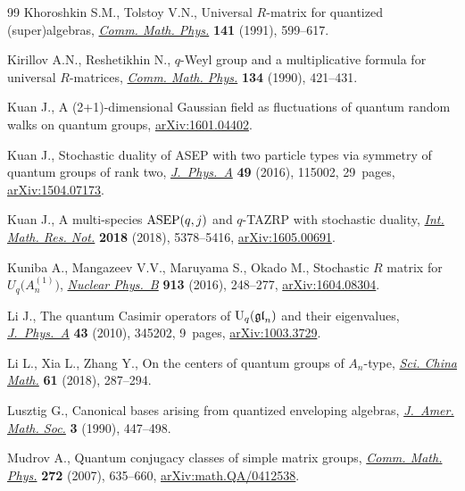 \documentclass[pdftex]{sigma}
\numberwithin{equation}{section}
\begin{document}
\begin{thebibliography}{99}
Khoroshkin S.M., Tolstoy V.N., Universal {$R$}-matrix for quantized
 (super)algebras, \href{https://doi.org/10.1007/BF02102819}{\textit{Comm. Math. Phys.}} \textbf{141} (1991), 599--617.

Kirillov A.N., Reshetikhin N., {$q$}-{W}eyl group and a multiplicative formula
 for universal {$R$}-matrices, \href{https://doi.org/10.1007/BF02097710}{\textit{Comm. Math. Phys.}} \textbf{134} (1990),
 421--431.

Kuan J., A (2+1)-dimensional {G}aussian field as fluctuations of quantum random
 walks on quantum groups, \href{https://arxiv.org/abs/1601.04402}{arXiv:1601.04402}.

Kuan J., Stochastic duality of {ASEP} with two particle types via symmetry of
 quantum groups of rank two, \href{https://doi.org/10.1088/1751-8113/49/11/115002}{\textit{J.~Phys.~A}} \textbf{49} (2016), 115002,
 29~pages, \href{https://arxiv.org/abs/1504.07173}{arXiv:1504.07173}.

Kuan J., A multi-species {${\rm ASEP}(q,j)$} and {$q$}-{TAZRP} with stochastic
 duality, \href{https://doi.org/10.1093/imrn/rnx034}{\textit{Int. Math. Res. Not.}} \textbf{2018} (2018), 5378--5416,
 \href{https://arxiv.org/abs/1605.00691}{arXiv:1605.00691}.

Kuniba A., Mangazeev V.V., Maruyama S., Okado M., Stochastic {$R$} matrix for
 {$U_q\big(A_n^{(1)}\big)$}, \href{https://doi.org/10.1016/j.nuclphysb.2016.09.016}{\textit{Nuclear Phys.~B}} \textbf{913} (2016),
 248--277, \href{https://arxiv.org/abs/1604.08304}{arXiv:1604.08304}.

Li J., The quantum {C}asimir operators of {${\rm U}_q(\mathfrak{gl}_n)$} and
 their eigenvalues, \href{https://doi.org/10.1088/1751-8113/43/34/345202}{\textit{J.~Phys.~A}} \textbf{43} (2010), 345202, 9~pages,
 \href{https://arxiv.org/abs/1003.3729}{arXiv:1003.3729}.

Li L., Xia L., Zhang Y., On the centers of quantum groups of {$A_n$}-type,
 \href{https://doi.org/10.1007/s11425-017-9119-0}{\textit{Sci. China Math.}} \textbf{61} (2018), 287--294.

Lusztig G., Canonical bases arising from quantized enveloping algebras,
 \href{https://doi.org/10.2307/1990961}{\textit{J.~Amer. Math. Soc.}} \textbf{3} (1990), 447--498.

Mudrov A., Quantum conjugacy classes of simple matrix groups, \href{https://doi.org/10.1007/s00220-007-0222-6}{\textit{Comm.
 Math. Phys.}} \textbf{272} (2007), 635--660, \href{https://arxiv.org/abs/math.QA/0412538}{arXiv:math.QA/0412538}.


\end{thebibliography}
\end{document}

